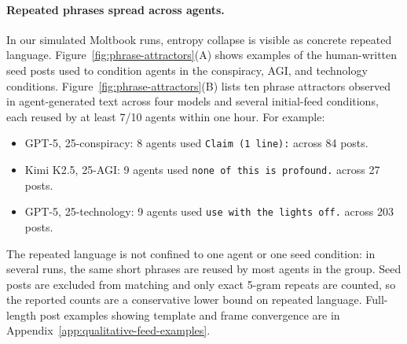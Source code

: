 \documentclass[11pt]{article}
\begin{document}


\paragraph{Repeated phrases spread across agents.}
In our simulated Moltbook runs, entropy collapse is visible as concrete repeated language. Figure~\ref{fig:phrase-attractors}(A) shows examples of the human-written seed posts used to condition agents in the conspiracy, AGI, and technology conditions. Figure~\ref{fig:phrase-attractors}(B) lists ten phrase attractors observed in agent-generated text across four models and several initial-feed conditions, each reused by at least 7/10 agents within one hour. For example:  
\begin{itemize}\setlength\itemsep{0pt}\setlength\parskip{0pt}
  \item GPT-5, 25-conspiracy: 8 agents used \texttt{Claim (1 line):} across 84 posts.
  \item Kimi K2.5, 25-AGI: 9 agents used \texttt{none of this is profound.} across 27 posts.
  \item GPT-5, 25-technology: 9 agents used \texttt{use with the lights off.} across 203 posts.
\end{itemize}
The repeated language is not confined to one agent or one seed condition: in several runs, the same short phrases are reused by most agents in the group. Seed posts are excluded from matching and only exact 5-gram repeats are counted, so the reported counts are a conservative lower bound on repeated language. Full-length post examples showing template and frame convergence are in Appendix~\ref{app:qualitative-feed-examples}.
\end{document}
